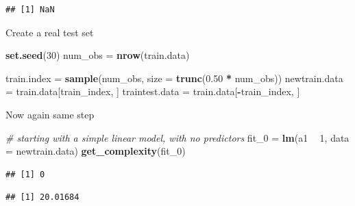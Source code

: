 \documentclass[]{report}
\newenvironment{Shaded}{\begin{snugshade}}{\end{snugshade}}
\newcommand{\KeywordTok}[1]{\textcolor[rgb]{0.13,0.29,0.53}{\textbf{#1}}}
\newcommand{\DataTypeTok}[1]{\textcolor[rgb]{0.13,0.29,0.53}{#1}}
\newcommand{\DecValTok}[1]{\textcolor[rgb]{0.00,0.00,0.81}{#1}}
\newcommand{\FloatTok}[1]{\textcolor[rgb]{0.00,0.00,0.81}{#1}}
\newcommand{\StringTok}[1]{\textcolor[rgb]{0.31,0.60,0.02}{#1}}
\newcommand{\CommentTok}[1]{\textcolor[rgb]{0.56,0.35,0.01}{\textit{#1}}}
\newcommand{\OperatorTok}[1]{\textcolor[rgb]{0.81,0.36,0.00}{\textbf{#1}}}
\newcommand{\NormalTok}[1]{#1}
\begin{document}
\begin{verbatim}
## [1] NaN
\end{verbatim}

Create a real test set

\begin{Shaded}
\begin{Highlighting}[]
\KeywordTok{set.seed}\NormalTok{(}\DecValTok{30}\NormalTok{)}
\NormalTok{num_obs =}\StringTok{ }\KeywordTok{nrow}\NormalTok{(train.data)}

\NormalTok{train.index =}\StringTok{ }\KeywordTok{sample}\NormalTok{(num_obs, }\DataTypeTok{size =} \KeywordTok{trunc}\NormalTok{(}\FloatTok{0.50} \OperatorTok{*}\StringTok{ }\NormalTok{num_obs))}
\NormalTok{newtrain.data =}\StringTok{ }\NormalTok{train.data[train_index, ]}
\NormalTok{traintest.data =}\StringTok{ }\NormalTok{train.data[}\OperatorTok{-}\NormalTok{train_index, ]}
\end{Highlighting}
\end{Shaded}

Now again same step

\begin{Shaded}
\begin{Highlighting}[]
\CommentTok{# starting with a simple linear model, with no predictors}
\NormalTok{fit_}\DecValTok{0}\NormalTok{ =}\StringTok{ }\KeywordTok{lm}\NormalTok{(a1 }\OperatorTok{~}\StringTok{ }\DecValTok{1}\NormalTok{, }\DataTypeTok{data =}\NormalTok{ newtrain.data)}
\KeywordTok{get_complexity}\NormalTok{(fit_}\DecValTok{0}\NormalTok{)}
\end{Highlighting}
\end{Shaded}

\begin{verbatim}
## [1] 0
\end{verbatim}

\begin{Shaded}
\end{Shaded}

\begin{verbatim}
## [1] 20.01684
\end{verbatim}
\end{document}
